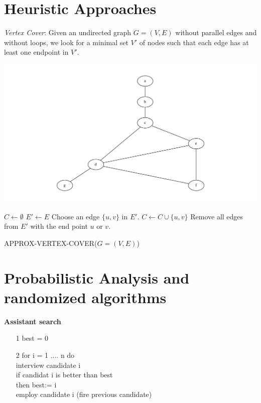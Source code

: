 \section{Heuristic Approaches}
\emph{Vertex Cover}: Given an undirected graph $G=(V,E)$ without parallel edges and without loops,
we look for a minimal set $V'$ of nodes such that each edge has at least one endpoint in $V'$.
\begin{example*}
\includegraphics[width=\textwidth]{diagrams/Chapter7_Example1.pdf}
\end{example*}
\begin{algorithm}
\begin{algorithmic}[1]
\State $C \gets \emptyset$
\State $E' \gets E$
	\State Choose an edge $\{u,v\}$ in $E'$.
	\State $C \gets C \cup \{u,v\}$
	\State Remove all edges from $E'$ with the end point $u$ or $v$.
\EndWhile
\end{algorithmic}
\caption{APPROX-VERTEX-COVER($G=(V,E)$)}
\end{algorithm}


\section{Probabilistic Analysis and randomized algorithms}

\textbf{Assistant search}
\begin{enumerate}
  \item[1] best = 0
  \item[2] for i = 1 .... n do\\
\noindent\hspace*{10mm}	interview candidate i\\
\noindent\hspace*{10mm}	if candidat i is better than best\\
\noindent\hspace*{20mm}		then best:= i\\
\noindent\hspace*{20mm}		employ candidate i (fire previous candidate)\\
\end{enumerate}


